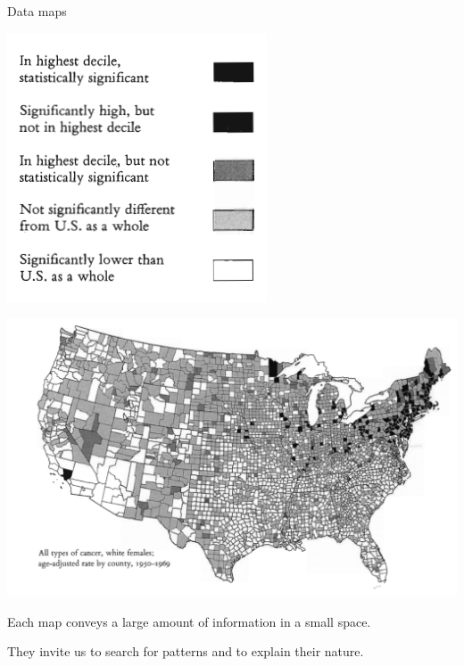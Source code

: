 \documentclass[
  ignorenonframetext,
]{beamer}
\begin{document}
\begin{frame}{Data maps}
\protect\hypertarget{data-maps}{}
\begin{minipage}{0.3\textwidth}
\centering
\includegraphics[width=\textwidth]{excellence_figs/fig_5.png}
\end{minipage}
\hfill
\begin{minipage}{0.6\textwidth}
\centering
\includegraphics[width=\textwidth]{excellence_figs/fig_4.png}
\end{minipage}

Each map conveys a large amount of information in a small space.

They invite us to search for patterns and to explain their nature.
\end{frame}
\end{document}
